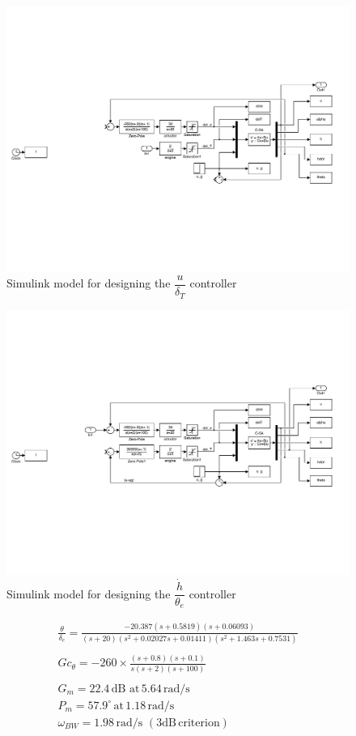 \documentclass[11pt]{article}
\begin{document}
\begin{figure}[b!]
\begin{center}
\includegraphics[width=.7\textwidth]{figures/u}
\caption{Simulink model for designing the $\dfrac{u}{\delta_T}$ controller}
\end{center}
\end{figure}

\begin{figure}[b!]
\begin{center}
\includegraphics[width=.7\textwidth]{figures/hdot}
\caption{Simulink model for designing the $\dfrac{\dot{h}}{\theta_e}$ controller}
\end{center}
\end{figure}
\clearpage

\begin{gather*}
\frac{\theta}{\delta_e}=\frac{-20.387 (s+0.5819) (s+0.06093)}{(s+20) (s^2 + 0.02027s + 0.01411) (s^2 + 1.463s + 0.7531)} \\
\\
\boxed{Gc_{\theta} = -260 \times \frac{(s+0.8)(s+0.1)}{s(s+2)(s+100)}} \\
\\
G_m=22.4\,\mathrm{dB\,\, at\,} 5.64 \,\mathrm{rad/s}  \\
P_m=57.9^{\circ}\, \mathrm{at}\, 1.18 \,\mathrm{rad/s} \\
\omega_{BW}=1.98\, \mathrm{rad/s}\,\mathrm{\,(3 dB\, criterion)}\\
\end{gather*}
\end{document}
